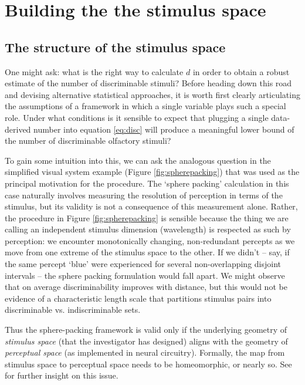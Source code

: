 \documentclass[letterpaper,twocolumn,10pt]{article}
\begin{document}
\section{Building the the stimulus space}
\label{correlations}
\subsection{The structure of the stimulus space}
One might ask: what is the right way to calculate $d$ in order to obtain a robust estimate of the number of discriminable stimuli? 
Before heading down this road and devising alternative statistical approaches, 
it is worth first clearly articulating the assumptions of a framework in which a single variable plays such a special role. 
Under what conditions is it sensible to expect that plugging a single data-derived number into equation \ref{eq:disc} 
will produce a meaningful lower bound of the number of discriminable olfactory stimuli?

To gain some intuition into this, 
we can ask the analogous question in the simplified visual system example (Figure \ref{fig:spherepacking}) 
that was used as the principal motivation for the procedure. 
The `sphere packing' calculation in this case naturally involves measuring the resolution of perception in terms of the stimulus, 
but its validity is not a consequence of this measurement alone. 
Rather, the procedure in Figure \ref{fig:spherepacking} is sensible  because the thing we are calling an independent stimulus dimension (wavelength) is respected as such by perception: 
we encounter monotonically changing, non-redundant percepts as we move from one extreme of the stimulus space to the other. 
If we didn't -- say, if the same percept `blue' were experienced for several non-overlapping disjoint intervals -- 
the sphere packing formulation would fall apart. 
We might observe that on average discriminability improves with distance,
but this would not be evidence of a characteristic length scale 
that partitions stimulus pairs into discriminable vs. indiscriminable sets.

Thus the sphere-packing framework is valid only if the underlying geometry of \emph{stimulus space} 
(that the investigator has designed) aligns with the geometry of \emph{perceptual space} (as implemented in neural circuitry). 
Formally, the map from stimulus space to perceptual space needs to be homeomorphic, or nearly so. 
See \cite{meister_can_2014} for further insight on this issue.  
\end{document}
